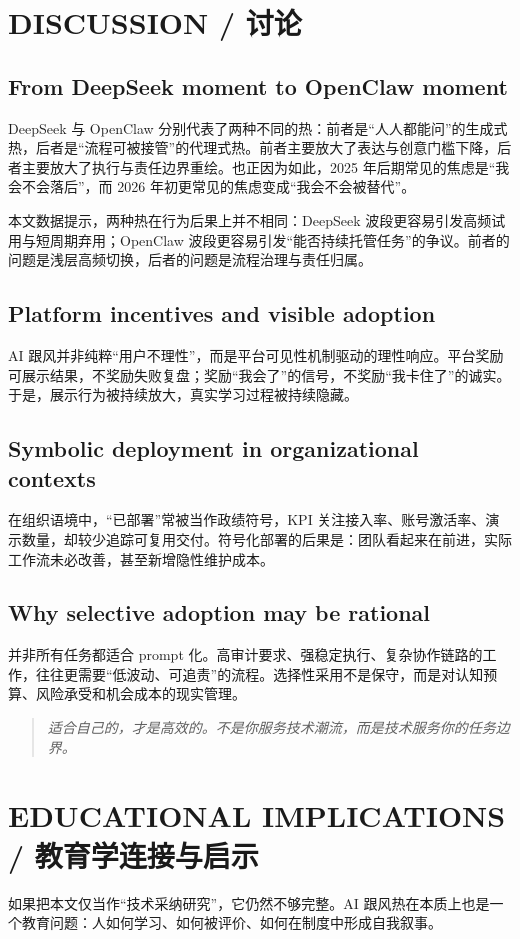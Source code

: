 \documentclass[11pt,a4paper]{ctexart}
\begin{document}
\section{DISCUSSION / 讨论}
\subsection{From DeepSeek moment to OpenClaw moment}
DeepSeek 与 OpenClaw 分别代表了两种不同的热：前者是“人人都能问”的生成式热，后者是“流程可被接管”的代理式热。前者主要放大了表达与创意门槛下降，后者主要放大了执行与责任边界重绘。也正因为如此，2025 年后期常见的焦虑是“我会不会落后”，而 2026 年初更常见的焦虑变成“我会不会被替代”。

本文数据提示，两种热在行为后果上并不相同：DeepSeek 波段更容易引发高频试用与短周期弃用；OpenClaw 波段更容易引发“能否持续托管任务”的争议。前者的问题是浅层高频切换，后者的问题是流程治理与责任归属。

\subsection{Platform incentives and visible adoption}
AI 跟风并非纯粹“用户不理性”，而是平台可见性机制驱动的理性响应。平台奖励可展示结果，不奖励失败复盘；奖励“我会了”的信号，不奖励“我卡住了”的诚实。于是，展示行为被持续放大，真实学习过程被持续隐藏。

\subsection{Symbolic deployment in organizational contexts}
在组织语境中，“已部署”常被当作政绩符号，KPI 关注接入率、账号激活率、演示数量，却较少追踪可复用交付。符号化部署的后果是：团队看起来在前进，实际工作流未必改善，甚至新增隐性维护成本。

\subsection{Why selective adoption may be rational}
并非所有任务都适合 prompt 化。高审计要求、强稳定执行、复杂协作链路的工作，往往更需要“低波动、可追责”的流程。选择性采用不是保守，而是对认知预算、风险承受和机会成本的现实管理。

\begin{quote}
\textit{适合自己的，才是高效的。不是你服务技术潮流，而是技术服务你的任务边界。}
\end{quote}

\section{EDUCATIONAL IMPLICATIONS / 教育学连接与启示}
如果把本文仅当作“技术采纳研究”，它仍然不够完整。AI 跟风热在本质上也是一个教育问题：人如何学习、如何被评价、如何在制度中形成自我叙事。
\end{document}
